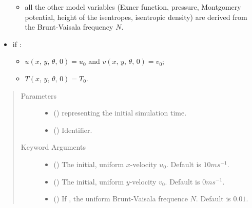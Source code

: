 \documentclass[letterpaper,10pt,english]{sphinxmanual}
\begin{document}
\begin{fulllineitems}
\begin{fulllineitems}
\begin{itemize}
\begin{itemize}
\item {} 
all the other model variables (Exner function, pressure, Montgomery potential, height of the                          isentropes, isentropic density) are derived from the Brunt-Vaisala frequency \(N\).

\end{itemize}

\item {} 
if :
\begin{itemize}
\item {} 
\(u(x, \, y, \, \theta, \, 0) = u_0\) and \(v(x, \, y, \, \theta, \, 0) = v_0\);

\item {} 
\(T(x, \, y, \, \theta, \, 0) = T_0\).

\end{itemize}

\end{itemize}
\begin{quote}\begin{description}
\item[{Parameters}] \leavevmode\begin{itemize}
\item {} 
 () \textendash{}  representing the initial simulation time.

\item {} 
 () \textendash{} Identifier.

\end{itemize}

\item[{Keyword Arguments}] \leavevmode\begin{itemize}
\item {} 
 () \textendash{} The initial, uniform \(x\)-velocity \(u_0\). Default is \(10 m s^{-1}\).

\item {} 
 () \textendash{} The initial, uniform \(y\)-velocity \(v_0\). Default is \(0 m s^{-1}\).

\item {} 
 () \textendash{} If , the uniform Brunt-Vaisala frequence \(N\). Default is \(0.01\).


\end{itemize}
\end{description}
\end{quote}
\end{fulllineitems}
\end{fulllineitems}
\end{document}
